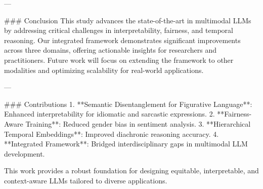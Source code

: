 ---

### Conclusion  
This study advances the state-of-the-art in multimodal LLMs by addressing critical challenges in interpretability, fairness, and temporal reasoning. Our integrated framework demonstrates significant improvements across three domains, offering actionable insights for researchers and practitioners. Future work will focus on extending the framework to other modalities and optimizing scalability for real-world applications.

---

### Contributions  
1. **Semantic Disentanglement for Figurative Language**: Enhanced interpretability for idiomatic and sarcastic expressions.  
2. **Fairness-Aware Training**: Reduced gender bias in sentiment analysis.  
3. **Hierarchical Temporal Embeddings**: Improved diachronic reasoning accuracy.  
4. **Integrated Framework**: Bridged interdisciplinary gaps in multimodal LLM development.  

This work provides a robust foundation for designing equitable, interpretable, and context-aware LLMs tailored to diverse applications.